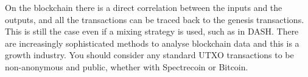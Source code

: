 On the blockchain there is a direct correlation between the inputs and the
outputs, and all the transactions can be traced back to the genesis
transactions. This is still the case even if a mixing strategy is used,
such as in DASH. There are increasingly sophisticated methods to analyse
blockchain data and this is a growth industry. You should consider any
standard UTXO transactions to be non-anonymous and public, whether with
Spectrecoin or Bitcoin.
